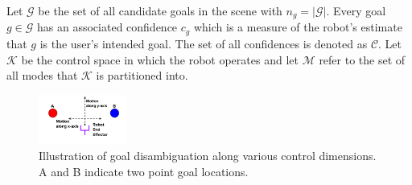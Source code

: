 \documentclass[conference]{IEEEtran}
\begin{document}
Let $\mathcal{G}$ be the set of all candidate goals in the scene with $n_g = \vert\mathcal{G}\vert$.
Every goal $g \in \mathcal{G}$ has an associated confidence $c_g$ which is a measure of the robot's estimate that $g$ is the user's intended goal. The set of all confidences is denoted as $\mathcal{C}$.
Let $\mathcal{K}$ be the control space in which the robot operates and  let $\mathcal{M}$ refer to the set of all modes that $\mathcal{K}$ is partitioned into.
\begin{figure}
	\vspace{-0.9cm}
	\includegraphics[width=0.26\textwidth]{./figures/DE_NEW.png}
	\vspace{-0.8cm}
	\caption{Illustration of goal disambiguation along various control dimensions. A and B indicate two point goal locations.}
	\label{DE}
\end{figure}

\end{document}
